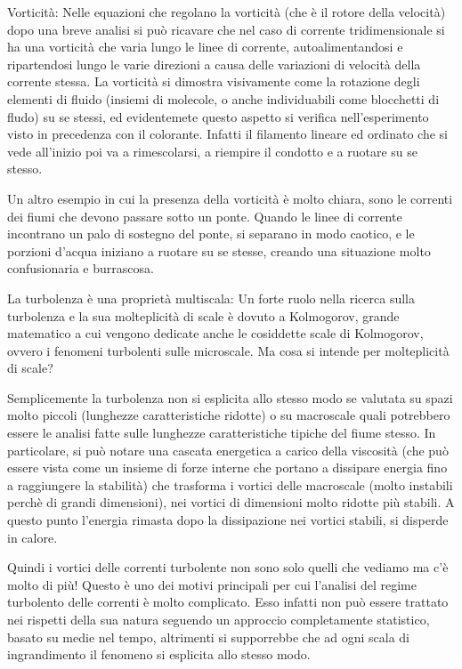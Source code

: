 Vorticità: Nelle equazioni che regolano la vorticità (che è il rotore della velocità) dopo una breve analisi si può ricavare che nel caso di corrente tridimensionale si ha una vorticità che varia lungo le linee di corrente, autoalimentandosi e ripartendosi lungo le varie direzioni a causa delle variazioni di velocità della corrente stessa. La vorticità si dimostra visivamente come la rotazione degli elementi di fluido (insiemi di molecole, o anche individuabili come blocchetti di fludo) su se stessi, ed evidentemete questo aspetto si verifica nell'esperimento visto in precedenza con il colorante. Infatti il filamento lineare ed ordinato che si vede all'inizio poi va a rimescolarsi, a riempire il condotto e a ruotare su se stesso.

Un altro esempio in cui la presenza della vorticità è molto chiara, sono le correnti dei fiumi che devono passare sotto un ponte. Quando le linee di corrente incontrano un palo di sostegno del ponte, si separano in modo caotico, e le porzioni d'acqua iniziano a ruotare su se stesse, creando una situazione molto confusionaria e burrascosa.

La turbolenza è una proprietà multiscala: Un forte ruolo nella ricerca sulla turbolenza e la sua molteplicità di scale è dovuto a Kolmogorov, grande matematico a cui vengono dedicate anche le cosiddette scale di Kolmogorov, ovvero i fenomeni turbolenti sulle microscale. Ma cosa si intende per molteplicità di scale?

Semplicemente la turbolenza non si esplicita allo stesso modo se valutata su spazi molto piccoli (lunghezze caratteristiche ridotte) o su macroscale quali potrebbero essere le analisi fatte sulle lunghezze caratteristiche tipiche del fiume stesso. In particolare, si può notare una cascata energetica a carico della viscosità (che può essere vista come un insieme di forze interne che portano a dissipare energia fino a raggiungere la stabilità) che trasforma i vortici delle macroscale (molto instabili perchè di grandi dimensioni), nei vortici di dimensioni molto ridotte più stabili. A questo punto l'energia rimasta dopo la dissipazione nei vortici stabili, si disperde in calore.

Quindi i vortici delle correnti turbolente non sono solo quelli che vediamo ma c'è molto di più! Questo è uno dei motivi principali per cui l'analisi del regime turbolento delle correnti è molto complicato. Esso infatti non può essere trattato nei rispetti della sua natura seguendo un approccio completamente statistico, basato su medie nel tempo, altrimenti si supporrebbe che ad ogni scala di ingrandimento il fenomeno si esplicita allo stesso modo.

